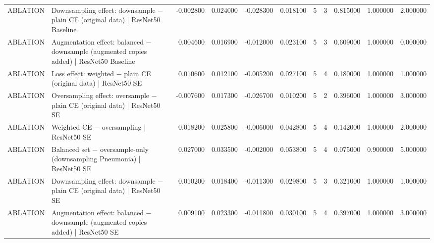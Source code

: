 \begin{tabular}{llrrrrrrrrr}
ABLATION & Downsampling effect: downsample − plain CE (original data) | ResNet50 Baseline & -0.002800 & 0.024000 & -0.028300 & 0.018100 & 5 & 3 & 0.815000 & 1.000000 & 2.000000 \\
ABLATION & Augmentation effect: balanced − downsample (augmented copies added) | ResNet50 Baseline & 0.004600 & 0.016900 & -0.012000 & 0.023100 & 5 & 3 & 0.609000 & 1.000000 & 0.000000 \\
ABLATION & Loss effect: weighted − plain CE (original data) | ResNet50 SE & 0.010600 & 0.012100 & -0.005200 & 0.027100 & 5 & 4 & 0.180000 & 1.000000 & 1.000000 \\
ABLATION & Oversampling effect: oversample − plain CE (original data) | ResNet50 SE & -0.007600 & 0.017300 & -0.026700 & 0.010200 & 5 & 2 & 0.396000 & 1.000000 & 3.000000 \\
ABLATION & Weighted CE − oversampling | ResNet50 SE & 0.018200 & 0.025800 & -0.006000 & 0.042800 & 5 & 4 & 0.142000 & 1.000000 & 2.000000 \\
ABLATION & Balanced set − oversample-only (downsampling Pneumonia) | ResNet50 SE & 0.027000 & 0.033500 & -0.002000 & 0.053800 & 5 & 4 & 0.075000 & 0.900000 & 5.000000 \\
ABLATION & Downsampling effect: downsample − plain CE (original data) | ResNet50 SE & 0.010200 & 0.018400 & -0.011300 & 0.029800 & 5 & 3 & 0.321000 & 1.000000 & 1.000000 \\
ABLATION & Augmentation effect: balanced − downsample (augmented copies added) | ResNet50 SE & 0.009100 & 0.023300 & -0.011800 & 0.030100 & 5 & 4 & 0.397000 & 1.000000 & 3.000000 \\
\bottomrule
\end{tabular}
